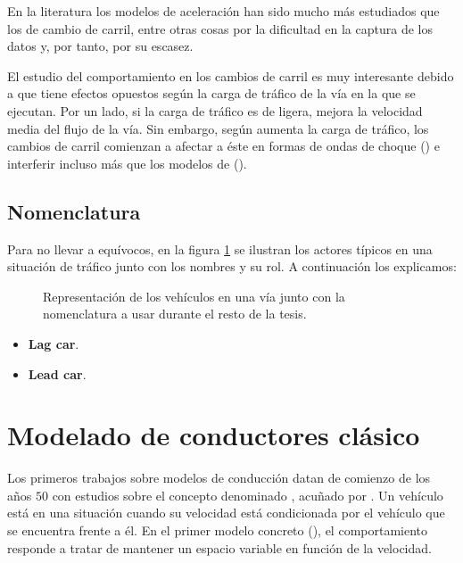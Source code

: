 En la literatura los modelos de aceleración han sido mucho más estudiados que los de cambio de carril, entre otras cosas por la dificultad en la captura de los datos y, por tanto, por su escasez.

El estudio del comportamiento en los cambios de carril es muy interesante debido a que tiene efectos opuestos según la carga de tráfico de la vía en la que se ejecutan. Por un lado, si la carga de tráfico es de ligera, mejora la velocidad media del flujo de la vía. Sin embargo, según aumenta la carga de tráfico, los cambios de carril comienzan a afectar a éste en formas de ondas de choque (\cite{Sasoh2002, Jin2006}) e interferir incluso más que los modelos de \textit{} (\cite{Laval2006}).

\subsection{Nomenclatura}

Para no llevar a equívocos, en la figura \ref{fig:lane-representation-with-namings} se ilustran los actores típicos en una situación de tráfico junto con los nombres y su rol. A continuación los explicamos:

\begin{figure}[t]
	\caption[Nomenclaturas a usar en los modelos de conducción]{Representación de los vehículos en una vía junto con la nomenclatura a usar durante el resto de la tesis.}
	\label{fig:lane-representation-with-namings}
\end{figure}

\begin{itemize}
	\item \textbf{Lag car}.
	\item \textbf{Lead car}.
\end{itemize}

\section{Modelado de conductores clásico}

Los primeros trabajos sobre modelos de conducción datan de comienzo de los años $50$ con estudios sobre el concepto denominado \textbf{}, acuñado por \cite{reuschel1950fahrzeugbewegungen}. Un vehículo está en una situación  cuando su velocidad está condicionada por el vehículo que se encuentra frente a él. En el primer modelo concreto (\cite{Pipes1953}), el comportamiento responde a tratar de mantener un espacio variable en función de la velocidad.

